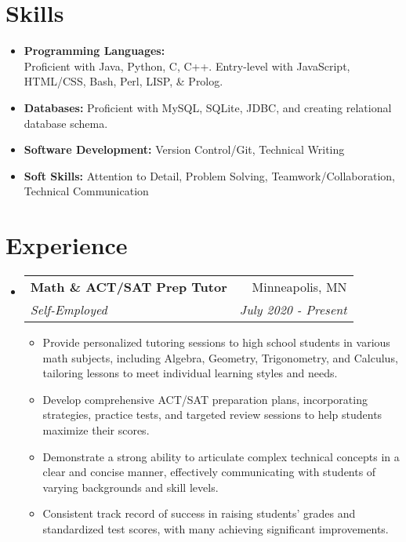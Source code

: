 \documentclass[letterpaper,11pt]{article}
\makeatletter
\newcommand{\resumeSubheading}[4]{
  \vspace{-1pt}\item
    \begin{tabular*}{0.97\textwidth}{l@{\extracolsep{\fill}}r}
      \textbf{#1} & #2 \\
      \textit{\small#3} & \textit{\small #4} \\
    \end{tabular*}\vspace{-5pt}
}
\newcommand{\projectItem}[1]{
  \item\small{
    {#1 \vspace{-2pt}}
  }
}
\newcommand{\resumeSubHeadingListStart}{\begin{itemize}[leftmargin=*]}
\newcommand{\resumeSubHeadingListEnd}{\end{itemize}}
\newcommand{\resumeItemListStart}{\begin{itemize}}
\newcommand{\resumeItemListEnd}{\end{itemize}\vspace{-5pt}}
\makeatother
\begin{document}
\section{Skills}
 \resumeSubHeadingListStart
   \item{
     \textbf{Programming Languages:}\\{Proficient with Java, Python, C, C++. Entry-level with JavaScript, HTML/CSS, Bash, Perl, LISP, \& Prolog.} \\ \vspace{-5pt}
   }
   \item{
     \textbf{Databases:}{ Proficient with MySQL, SQLite, JDBC, and creating relational database schema.} \\ \vspace{-5pt}
     
   }
   \item{
     \textbf{Software Development:}{ Version Control/Git, Technical Writing} \\ \vspace{-5pt}
     
   }
   \item{
     \textbf{Soft Skills:}{ Attention to Detail, Problem Solving, Teamwork/Collaboration, Technical Communication} \\ \vspace{-5pt}
     
   }   
   
 \resumeSubHeadingListEnd

\section{Experience}
  \resumeSubHeadingListStart
    \resumeSubheading
      {Math \& ACT/SAT Prep Tutor}{Minneapolis, MN}
      {Self-Employed}{July 2020 - Present}
      \resumeItemListStart
        \projectItem
          {Provide personalized tutoring sessions to high school students in various math subjects, including Algebra, Geometry, Trigonometry, and Calculus, tailoring lessons to meet individual learning styles and needs.}
        \projectItem
          {Develop comprehensive ACT/SAT preparation plans, incorporating strategies, practice tests, and targeted review sessions to help students maximize their scores.}
        \projectItem
          {Demonstrate a strong ability to articulate complex technical concepts in a clear and concise manner, effectively communicating with students of varying backgrounds and skill levels.}
        \projectItem
          {Consistent track record of success in raising students' grades and standardized test scores, with many achieving significant improvements.}
      \resumeItemListEnd \vspace{-5pt}
  \resumeSubHeadingListEnd 
\end{document}
